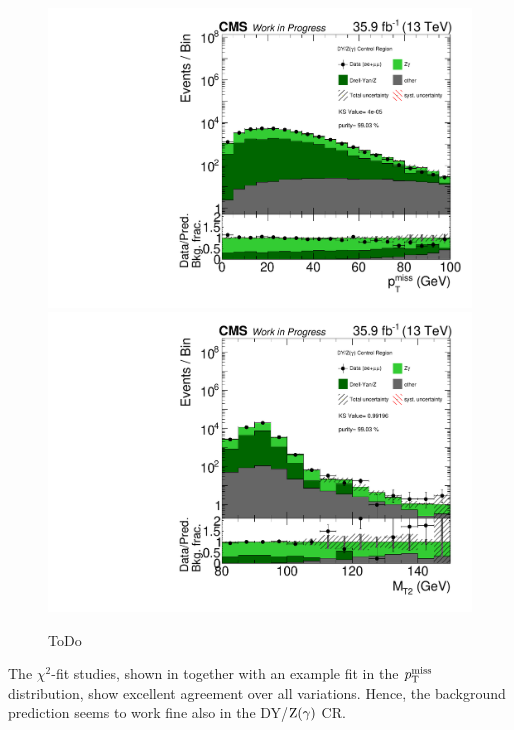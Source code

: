 \begin{figure}[htb]
 \centering
 \includegraphics[width=\pairwidth]{figures/plots_CR_dy/CRDY_LL_nom_met_log}
 \includegraphics[width=\pairwidth]{figures/plots_CR_dy/CRDY_LL_nom_mt2_log}
 \caption{ToDo}
 \label{fig:CRDY}
\end{figure}
The $\chi^2$-fit studies, shown in  together with an example fit in the $p_{\mathrm{T}}^\text{miss}$ distribution, show excellent agreement over all variations. Hence, the background prediction seems to work fine also in the DY/$\mathrm{Z}(\gamma)$ CR.


